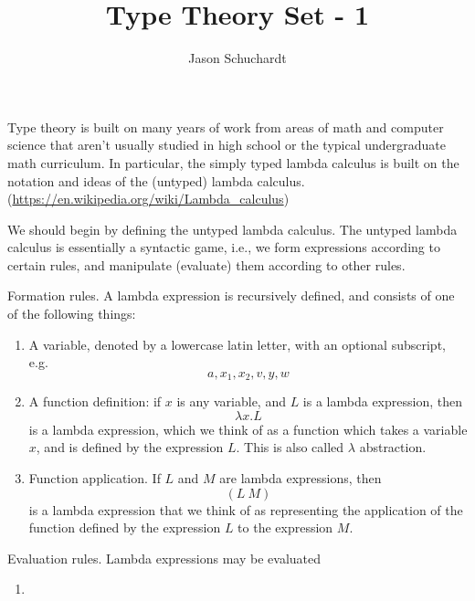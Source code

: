 \documentclass{article}
\title{Type Theory Set - 1}
\author{Jason Schuchardt}
\begin{document}
\maketitle

Type theory is built on many years of work from areas of math
and computer science
that aren't usually studied in high school or the typical
undergraduate math curriculum. In particular, the simply typed 
lambda calculus is built on the notation and ideas of the
(untyped) lambda calculus.
(\url{https://en.wikipedia.org/wiki/Lambda_calculus})

\begin{definition}
    We should begin by defining the untyped lambda calculus.
    The untyped lambda calculus is essentially a syntactic game,
    i.e., we form expressions according to certain rules,
    and manipulate (evaluate) them according to other rules.

    Formation rules. A lambda expression is recursively defined,
    and consists of one of the following things:
    \begin{enumerate}
        \item A variable, denoted by a lowercase latin letter,
            with an optional subscript, e.g.
            \[a,x_1,x_2,v,y,w\]
        \item A function definition: if $x$ is any variable, and $L$ is 
            a lambda expression, then 
            \[\lambda x.L\]
            is a lambda expression, which we think of as a
            function which takes a variable $x$, and is defined 
            by the expression $L$. This is also called 
            $\lambda$ abstraction.
        \item Function application. If $L$ and $M$ are lambda
            expressions, then \[ (L\ M) \] is a lambda expression
            that we think of as representing the application
            of the function defined by the expression $L$ to 
            the expression $M$.
    \end{enumerate}

    Evaluation rules. Lambda expressions may be evaluated 
\end{definition}

\begin{enumerate}[(1)]
    \item 
\end{enumerate}
\end{document}

